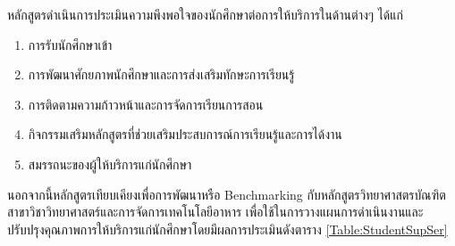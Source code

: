 \noindent
หลักสูตรดำเนินการประเมินความพึงพอใจของนักศึกษาต่อการให้บริการในด้านต่างๆ ได้แก่
\begin{enumerate}
\item การรับนักศึกษาเข้า
\item การพัฒนาศักยภาพนักศึกษาและการส่งเสริมทักษะการเรียนรู้
\item การติดตามความก้าวหน้าและการจัดการเรียนการสอน
\item กิจกรรมเสริมหลักสูตรที่ช่วยเสริมประสบการณ์การเรียนรู้และการได้งาน
\item สมรรถนะของผู้ให้บริการแก่นักศึกษา
\end{enumerate}

นอกจากนี้หลักสูตรเทียบเคียงเพื่อการพัฒนาหรือ Benchmarking กับหลักสูตรวิทยาศาสตรบัณฑิต สาขาวิชาวิทยาศาสตร์และการจัดการเทคโนโลยีอาหาร เพื่อใช้ในการวางแผนการดำเนินงานและปรับปรุงคุณภาพการให้บริการแก่นักศึกษาโดยมีผลการประเมินดังตาราง \ref{Table:StudentSupSer}
 
